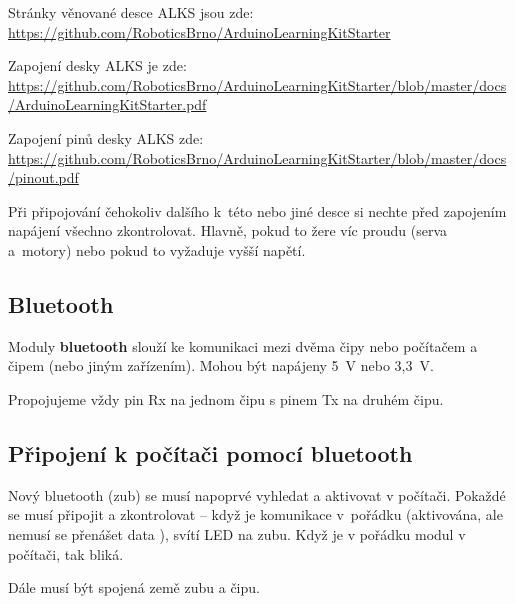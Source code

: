 Stránky  věnované desce ALKS jsou zde: \newline \url{https://github.com/RoboticsBrno/ArduinoLearningKitStarter}  

Zapojení \emergencystretch=2cm desky ALKS je zde: \url{https://github.com/RoboticsBrno/ArduinoLearningKitStarter/blob/master/docs/ArduinoLearningKitStarter.pdf}

Zapojení pinů desky ALKS zde: \url{https://github.com/RoboticsBrno/ArduinoLearningKitStarter/blob/master/docs/pinout.pdf}

Při připojování čehokoliv dalšího k~této nebo jiné desce si nechte před zapojením napájení všechno zkontrolovat. Hlavně, pokud to žere víc proudu (serva a~motory) nebo pokud to vyžaduje vyšší napětí. 


\subsection{Bluetooth}


\hypertarget{bluetooth}{} Moduly {\bf bluetooth} slouží ke komunikaci mezi dvěma čipy nebo počítačem a čipem (nebo jiným zařízením).
Mohou být napájeny 5~V nebo 3,3~V. 

Propojujeme vždy pin Rx na jednom čipu s pinem Tx na druhém čipu. 

\subsection{Připojení k počítači pomocí bluetooth}

Nový bluetooth (zub) se musí napoprvé vyhledat a aktivovat v počítači. 
Pokaždé se musí připojit a zkontrolovat -- když je komunikace v~pořádku (aktivována, ale nemusí se přenášet data ), svítí LED na zubu. 
Když je v pořádku modul v počítači, tak bliká.  

Dále musí být spojená země zubu a čipu.



